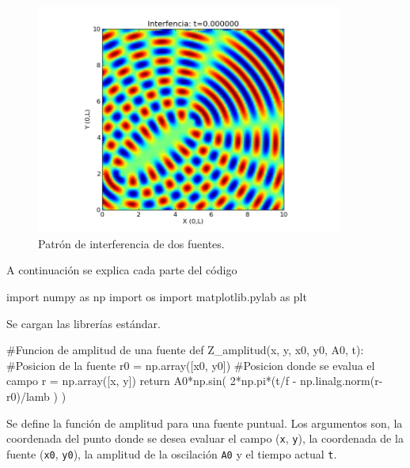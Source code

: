 \begin{figure}[htbp]
	\centering
	\includegraphics[width=0.90\textwidth]
	{./pictures/Two_Sources.png}

	\caption{\small{Patrón de interferencia de dos fuentes.}}
	
	\label{fig:interference}
\end{figure}


A continuación se explica cada parte del código


\begin{listing}[style=python, numbers = none]
import numpy as np
import os
import matplotlib.pylab as plt
\end{listing}
Se cargan las librerías estándar.


\begin{listing}[style=python, numbers = none]
#Funcion de amplitud de una fuente
def Z_amplitud(x, y, x0, y0, A0, t):
    #Posicion de la fuente
    r0 = np.array([x0, y0])
    #Posicion donde se evalua el campo
    r = np.array([x, y])
    return A0*np.sin( 2*np.pi*(t/f - np.linalg.norm(r-r0)/lamb ) )
\end{listing}
Se define la función de amplitud para una fuente puntual. Los argumentos
son, la coordenada del punto donde se desea evaluar el campo (\texttt{x},
\texttt{y}), la coordenada de la fuente (\texttt{x0}, \texttt{y0}), la
amplitud de la oscilación \texttt{A0} y el tiempo actual \texttt{t}.


